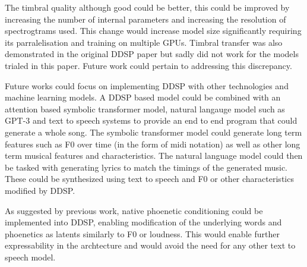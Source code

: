 The timbral quality although good could be better, this could be improved by increasing the number of internal parameters and increasing the resolution of spectrogtrams used. This change would increase model size significantly requiring its parralelisation and training on multiple GPUs. Timbral transfer was also demonstrated in the original DDSP paper but sadly did not work for the models trialed in this paper. Future work could pertain to addressing this discrepancy.

Future works could focus on implementing DDSP with other technologies and machine learning models. A DDSP based model could be combined with an attention based symbolic transformer model, natural langauge model such as GPT-3\cite{GPT3} and text to speech systems to provide an end to end program that could generate a whole song. The symbolic transformer model could generate long term features such as F0 over time (in the form of midi notation) as well as other long term musical features and characteristics. The natural language model could then be tasked with generating lyrics to match the timings of the generated music. These could be synthesized using text to speech and F0 or other characteristics modified by DDSP.

As suggested by previous work\cite{SingingDDSP}, native phoenetic conditioning could be implemented into DDSP, enabling modification of the underlying words and phoenetics as latents similarly to F0 or loudness. This would enable further expressability in the archtecture and would avoid the need for any other text to speech model.